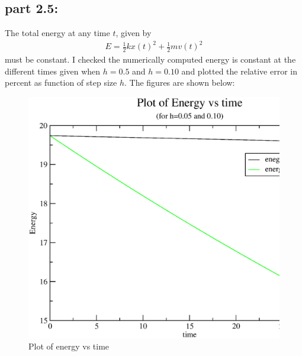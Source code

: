 \documentclass[11pt,a4paper,english]{article}
\newcommand{\beqa}{\begin{eqnarray}}
\newcommand{\eeqa}{\end{eqnarray}}
\begin{document}
    \subsection{part 2.5: }
    The total energy at any time $t$, given by
    \beqa 
    E = \frac{1}{2}kx(t)^{2} + \frac{1}{2}mv(t)^{2}
    \eeqa
    must be constant. I checked the numerically computed energy is constant at the 
    different times given when  $h=0.5$ and $h=0.10$ and plotted the relative error in percent as
    function of step size $h$. 
    		    The figures are shown below:\\
	\begin{figure}[h!]
	\centering
	\includegraphics [scale=0.6]{figures/energytime.eps}
	\caption{Plot of energy vs time }
	\end{figure}
\end{document}
